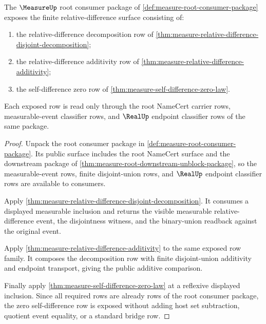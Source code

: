 

\begin{theorem}
\label{thm:measure-root-relative-difference-consumer-surface}
The $\MeasureUp$ root consumer package of
\autoref{def:measure-root-consumer-package} exposes the finite
relative-difference surface consisting of:
\begin{enumerate}
  \item the relative-difference decomposition row of
  \autoref{thm:measure-relative-difference-disjoint-decomposition};
  \item the relative-difference additivity row of
  \autoref{thm:measure-relative-difference-additivity};
  \item the self-difference zero row of
  \autoref{thm:measure-self-difference-zero-law}.
\end{enumerate}
Each exposed row is read only through the root NameCert carrier rows,
measurable-event classifier rows, and $\RealUp$ endpoint classifier rows of the
same package.
\end{theorem}
\begin{proof}
Unpack the root consumer package in
\autoref{def:measure-root-consumer-package}. Its public surface includes the
root NameCert surface and the downstream package of
\autoref{thm:measure-root-downstream-unblock-package}, so the measurable-event
rows, finite disjoint-union rows, and $\RealUp$ endpoint classifier rows are
available to consumers.

Apply
\autoref{thm:measure-relative-difference-disjoint-decomposition}. It consumes a
displayed measurable inclusion and returns the visible measurable
relative-difference event, the disjointness witness, and the binary-union
readback against the original event.

Apply \autoref{thm:measure-relative-difference-additivity} to the same exposed
row family. It composes the decomposition row with finite disjoint-union
additivity and endpoint transport, giving the public additive comparison.

Finally apply \autoref{thm:measure-self-difference-zero-law} at a reflexive
displayed inclusion. Since all required rows are already rows of the root
consumer package, the zero self-difference row is exposed without adding host
set subtraction, quotient event equality, or a standard bridge row.
\end{proof}


